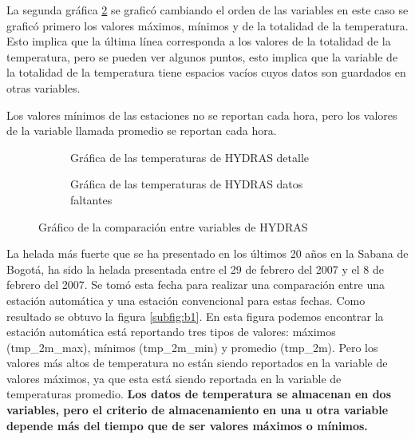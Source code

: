 \documentclass[11pt]{article}
\begin{document}
La segunda gráfica \ref{subfig:b10} se graficó cambiando el orden de las variables en este caso se graficó primero los valores máximos, mínimos y de la totalidad de la temperatura. Esto implica que la última línea corresponda a los valores de la totalidad de la temperatura, pero se pueden ver algunos puntos, esto implica que la variable de la totalidad de la temperatura tiene espacios vacíos cuyos datos son guardados en otras variables.

Los valores mínimos de las estaciones no se reportan cada hora, pero los valores de la variable llamada promedio se reportan cada hora.

\begin{figure}[H]
	\centering
			\begin{subfigure}[b]{0.3\textwidth}

			\caption{Gráfica de las temperaturas de HYDRAS detalle}
			\label{subfig:b9}

			\end{subfigure}
			\begin{subfigure}[b]{0.3\textwidth}

		\caption{Gráfica de las temperaturas de HYDRAS datos faltantes}
			\label{subfig:b10}

			\end{subfigure}			

		
		\caption{Gráfico de la comparación entre variables de HYDRAS}
		\label{gra:conv_vali}
	
\end{figure}



La helada más fuerte que se ha presentado en los últimos 20 años en la Sabana de Bogotá, ha sido la helada presentada entre el 29 de febrero del 2007 y el 8 de febrero del 2007. Se tomó esta fecha para realizar una comparación entre una estación automática y una estación convencional para estas fechas. Como resultado se obtuvo la figura \ref{subfig:b1}. En esta figura podemos encontrar la estación automática está reportando tres tipos de valores: máximos (tmp\_2m\_max), mínimos (tmp\_2m\_min) y promedio (tmp\_2m). Pero los valores más altos de temperatura no están siendo reportados en la variable de valores máximos, ya que esta está siendo reportada en la variable de temperaturas promedio. \textbf{Los datos de temperatura se almacenan en dos variables, pero el criterio de almacenamiento en una u otra variable depende más del tiempo que de ser valores máximos o mínimos.}\\
\end{document}
